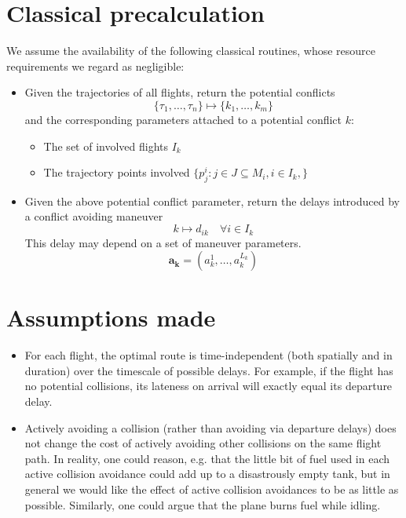 \documentclass{article}
\begin{document}
\section{Classical precalculation}
\label{sec:classical_precalculation}
We assume the availability of the following classical routines, whose resource requirements we regard as negligible:
\begin{itemize}
\item Given the trajectories of all flights, return the potential conflicts
    \begin{equation*}
        \{\tau_1, \dots, \tau_n\} \mapsto \{k_1, \dots, k_m\}
    \end{equation*}
    and the corresponding parameters attached to a potential conflict $k$:
    \begin{itemize}
        \item The set of involved flights $I_k$
        \item The trajectory points involved $\{p^i_j : j\in J \subseteq M_i,  i \in I_k,\}$
    \end{itemize}
\item Given the above potential conflict parameter, return the delays introduced by a conflict avoiding maneuver
    \begin{equation*}
        k \mapsto d_{ik} \quad \forall i \in I_k 
    \end{equation*}
    This delay may depend on a set of maneuver parameters. 
    \begin{equation*}
        \mathbf{a_k} =  (a^1_k, \dots, a^{L_k}_k)
    \end{equation*}
\end{itemize}

\section{Assumptions made}
\begin{itemize}
  \item For each flight, the optimal route is time-independent (both spatially and in duration) over the timescale of possible delays.
    For example, if the flight has no potential collisions, its lateness on arrival will exactly equal its departure delay.
  \item Actively avoiding a collision (rather than avoiding via departure delays) does not change the cost of actively avoiding other collisions on the same flight path. In reality, one could reason, e.g. that the little bit of fuel used in each active collision avoidance could add up to a disastrously empty tank, but in general we would like the effect of active collision avoidances to be as little as possible.
    Similarly, one could argue that the plane burns fuel while idling.
\end{itemize}
\end{document}
